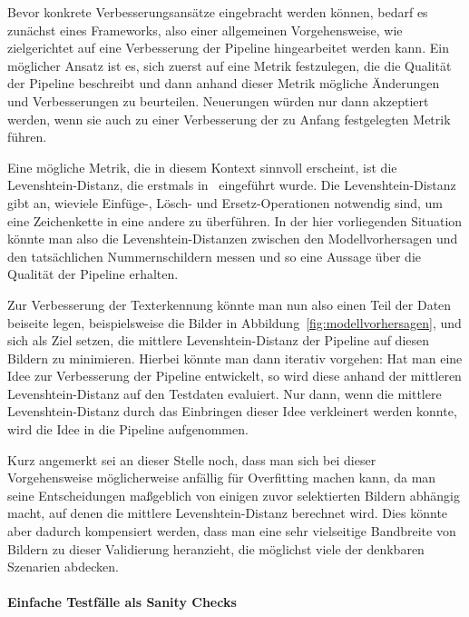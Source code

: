Bevor konkrete Verbesserungsans\"atze eingebracht werden k\"onnen, bedarf
es zun\"achst eines Frameworks, also einer allgemeinen Vorgehensweise,
wie zielgerichtet auf eine Verbesserung der Pipeline hingearbeitet werden kann.
Ein m\"oglicher Ansatz ist es, sich zuerst auf eine Metrik festzulegen,
die die Qualit\"at
der Pipeline beschreibt und dann anhand dieser Metrik m\"ogliche
\"Anderungen und Verbesserungen zu beurteilen.
Neuerungen w\"urden nur dann akzeptiert werden, wenn sie auch zu einer
Verbesserung der zu Anfang festgelegten Metrik f\"uhren.

Eine m\"ogliche Metrik, die in diesem Kontext sinnvoll erscheint,
ist die Levenshtein-Distanz, die erstmals in~\cite{levenshtein}
eingef\"uhrt wurde.
Die Levenshtein-Distanz gibt an, wieviele Einf\"uge-, L\"osch- und
Ersetz-Operationen notwendig sind, um eine Zeichenkette in eine
andere zu \"uberf\"uhren.
In der hier vorliegenden Situation k\"onnte man also die
Levenshtein-Distanzen zwischen den Modellvorhersagen und den
tats\"achlichen Nummernschildern messen und so eine Aussage \"uber
die Qualit\"at der Pipeline erhalten.

Zur Verbesserung der Texterkennung k\"onnte man nun also einen Teil der
Daten beiseite legen, beispielsweise die Bilder in Abbildung~\ref{fig:modellvorhersagen},
und sich als Ziel setzen, die mittlere Levenshtein-Distanz der
Pipeline auf diesen Bildern zu minimieren.
Hierbei k\"onnte man dann iterativ vorgehen: Hat man eine Idee zur
Verbesserung der Pipeline entwickelt, so wird diese anhand der
mittleren Levenshtein-Distanz auf den Testdaten evaluiert.
Nur dann, wenn die mittlere Levenshtein-Distanz durch das Einbringen
dieser Idee verkleinert werden konnte, wird die Idee in die Pipeline
aufgenommen.

Kurz angemerkt sei an dieser Stelle noch, dass man sich bei dieser
Vorgehensweise m\"oglicherweise anf\"allig f\"ur Overfitting
machen kann, da man seine Entscheidungen ma{\ss}geblich von einigen zuvor
selektierten Bildern abh\"angig macht, auf denen die mittlere
Levenshtein-Distanz berechnet wird.
Dies k\"onnte aber dadurch kompensiert werden, dass man eine sehr
vielseitige Bandbreite von Bildern zu dieser Validierung heranzieht,
die m\"oglichst viele der denkbaren Szenarien abdecken.

\paragraph{Einfache Testf\"alle als \glqq Sanity Checks\grqq{}}

